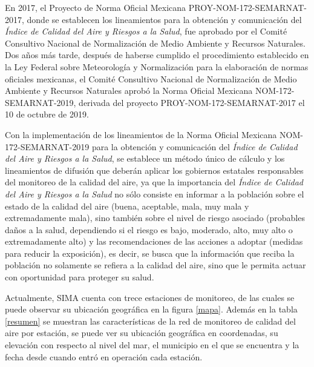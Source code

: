En 2017, el Proyecto de Norma Oficial Mexicana PROY-NOM-172-SEMARNAT-2017, donde se establecen los lineamientos para la obtención y comunicación del {\em Índice de Calidad del Aire y Riesgos a la Salud}, fue aprobado por el Comité Consultivo Nacional de Normalización de Medio Ambiente y Recursos Naturales. Dos años más tarde, después de haberse cumplido el procedimiento establecido en la Ley Federal sobre Meteorología y Normalización para la elaboración de normas oficiales mexicanas, el Comité Consultivo Nacional de Normalización de Medio Ambiente y Recursos Naturales aprobó la Norma Oficial Mexicana NOM-172-SEMARNAT-2019, derivada del proyecto PROY-NOM-172-SEMARNAT-2017 el 10 de octubre de 2019.

Con la implementación de los lineamientos de la Norma Oficial Mexicana NOM-172-SEMARNAT-2019 para la obtención y comunicación del {\em Índice de Calidad del Aire y Riesgos a la Salud}, se establece un método único de cálculo y los lineamientos de difusión que deberán aplicar los gobiernos estatales responsables del monitoreo de la calidad del aire, ya que la importancia del {\em Índice de Calidad del Aire y Riesgos a la Salud} no sólo consiste en informar a la población sobre el estado de la calidad del aire (buena, aceptable, mala, muy mala y extremadamente mala), sino también sobre el nivel de riesgo asociado (probables daños a la salud, dependiendo si el riesgo es bajo, moderado, alto, muy alto o extremadamente alto) y las recomendaciones de las acciones a adoptar (medidas para reducir la exposición), es decir, se busca que la información que reciba la población no solamente se refiera a la calidad del aire, sino que le permita actuar con oportunidad para proteger su salud.


Actualmente, SIMA cuenta con trece estaciones de monitoreo, de las cuales se puede observar su ubicación geográfica en la figura \ref{mapa}. Además en la tabla \ref{resumen} se muestran las características de la red de monitoreo de calidad del aire por estación, se puede ver su ubicación geográfica en coordenadas, su elevación con respecto al nivel del mar, el municipio en el que se encuentra y la fecha desde cuando entró en operación cada estación.


